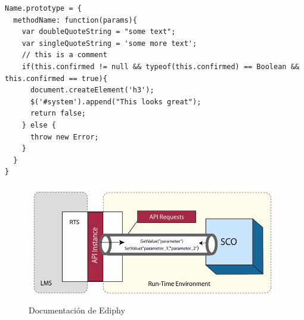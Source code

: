 \begin{lstlisting} 
Name.prototype = {
  methodName: function(params){
    var doubleQuoteString = "some text";
    var singleQuoteString = 'some more text';
    // this is a comment
    if(this.confirmed != null && typeof(this.confirmed) == Boolean && this.confirmed == true){
      document.createElement('h3');
      $('#system').append("This looks great");
      return false;
    } else {
      throw new Error;
    }
  }
}
\end{lstlisting}
\begin{figure}[H]
\centering
\includegraphics[width=\textwidth]{figures/SCORM_Data_Model_API.png}
\caption{Documentación de Ediphy}

\end{figure}
